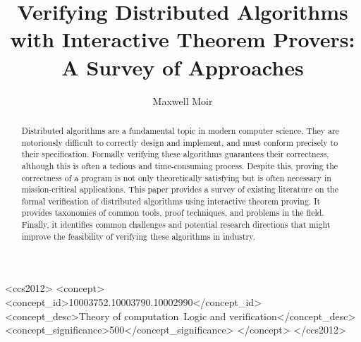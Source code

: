 \documentclass[acmsmall,screen,review]{acmart}
\begin{document}
\title{Verifying Distributed Algorithms with Interactive Theorem Provers: A Survey of Approaches}

\author{Maxwell Moir}


\renewcommand{\shortauthors}{Moir}


\begin{abstract}
  

  Distributed algorithms are a fundamental topic in modern computer science.
  They are notoriously difficult to correctly design and implement, and must conform precisely to their specification.
  Formally verifying these algorithms guarantees their correctness, although this is often a tedious and time-consuming process. 
  Despite this, proving the correctness of a program is not only theoretically satisfying but is often necessary in mission-critical applications.
  This paper provides a survey of existing literature on the formal verification of distributed algorithms using interactive theorem proving.
  It provides taxonomies of common tools, proof techniques, and problems in the field.
  Finally, it identifies common challenges and potential research directions
  that might improve the feasibility of verifying these algorithms in industry.

\end{abstract}

\begin{CCSXML}
  <ccs2012>
    <concept>
        <concept_id>10003752.10003790.10002990</concept_id>
        <concept_desc>Theory of computation~Logic and verification</concept_desc>
        <concept_significance>500</concept_significance>
        </concept>
  </ccs2012>
\end{CCSXML}




\maketitle
\end{document}
